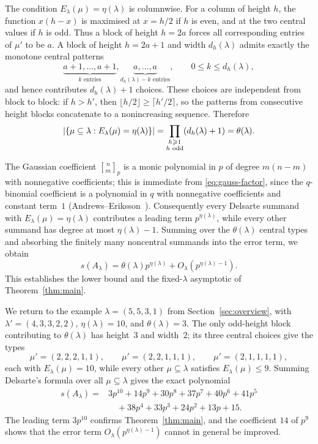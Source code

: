 \documentclass[a4paper,11pt,reqno]{amsart}
\theoremstyle{plain}
\theoremstyle{remark}
\numberwithin{equation}{section}
\newcommand{\card}[1]{\left\lvert #1\right\rvert}
\newcommand{\gauss}[2]{\genfrac{[}{]}{0pt}{}{#1}{#2}_p}
\renewcommand{\leq}{\leqslant}
\renewcommand{\geq}{\geqslant}
\begin{document}
The condition $E_\lambda(\mu)=\eta(\lambda)$ is columnwise. For a column of
height $h$, the function $x(h-x)$ is maximised at $x=h/2$ if $h$ is even, and
at the two central values if $h$ is odd. Thus a block of height $h=2a$ forces
all corresponding entries of $\mu'$ to be $a$. A block of height $h=2a+1$ and
width $d_h(\lambda)$ admits exactly the monotone central patterns
\[
        \underbrace{a+1,\ldots,a+1}_{\text{$k$ entries}},
        \underbrace{a,\ldots,a}_{d_h(\lambda)-k\text{ entries}},
        \qquad 0\leq k\leq d_h(\lambda),
\]
and hence contributes $d_h(\lambda)+1$ choices. These choices are independent
from block to block: if $h>h'$, then
$\lfloor h/2\rfloor\geq \lceil h'/2\rceil$, so the patterns from consecutive
height blocks concatenate to a nonincreasing sequence. Therefore
\[
        \card{\{\mu\subseteq\lambda : E_\lambda(\mu)=\eta(\lambda)\}}
        =
        \prod_{\substack{h\geq 1\\ h\textnormal{ odd}}}
        (d_h(\lambda)+1)
        =
        \theta(\lambda).
\]

The Gaussian coefficient $\gauss{n}{m}$ is a monic polynomial in $p$ of
degree $m(n-m)$ with nonnegative coefficients; this is immediate from
\eqref{eq:gauss-factor}, since the $q$-binomial coefficient is a polynomial
in $q$ with nonnegative coefficients and constant term~$1$
(Andrews--Eriksson~\cite[Chap.~7]{AndrewsEriksson}). Consequently every
Delsarte summand with $E_\lambda(\mu)=\eta(\lambda)$ contributes a leading
term $p^{\eta(\lambda)}$, while every other summand has degree at most
$\eta(\lambda)-1$. Summing over the $\theta(\lambda)$ central types and
absorbing the finitely many noncentral summands into the error term, we
obtain
\[
        s(A_\lambda)=
        \theta(\lambda)p^{\eta(\lambda)}
        +O_\lambda(p^{\eta(\lambda)-1}).
\]
This establishes the lower bound and the fixed-$\lambda$ asymptotic of
Theorem~\ref{thm:main}.

We return to the example $\lambda=(5,5,3,1)$ from
Section~\ref{sec:overview}, with $\lambda'=(4,3,3,2,2)$, $\eta(\lambda)=10$,
and $\theta(\lambda)=3$. The only odd-height block contributing to
$\theta(\lambda)$ has height~$3$ and width~$2$; its three central choices
give the types
\[
        \mu'=(2,2,2,1,1),\qquad
        \mu'=(2,2,1,1,1),\qquad
        \mu'=(2,1,1,1,1),
\]
each with $E_\lambda(\mu)=10$, while every other $\mu\subseteq\lambda$
satisfies $E_\lambda(\mu)\leq 9$. Summing Delsarte's formula over all
$\mu\subseteq\lambda$ gives the exact polynomial
\[
\begin{aligned}
        s(A_\lambda)
        ={ }&3p^{10}+14p^9+30p^8+37p^7+40p^6+41p^5 \\
        &\quad +38p^4+33p^3+24p^2+13p+15.
\end{aligned}
\]
The leading term $3p^{10}$ confirms Theorem~\ref{thm:main}, and the
coefficient $14$ of $p^9$ shows that the error term
$O_\lambda(p^{\eta(\lambda)-1})$ cannot in general be improved.
\end{document}

